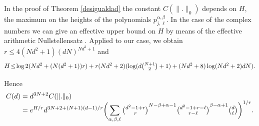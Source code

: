 \begin{obs}\label{effective} In the proof of Theorem \ref{desigualdad} the constant $C(\|.\|_0)$ depends on $H$, the maximum on the heights of the polynomials $p_{j,\ell}^{\alpha,\beta}$. In the case of the complex numbers we can give an effective upper bound on $H$ by means of the effective arithmetic Nullstellensatz \cite[Th.\,1]{klpasom}. Applied to our case, we obtain $r\leq 4(Nd^2+1)(dN)^{Nd^2+1}$ and
\begin{equation*}
H\!\leq\!\log{2}(Nd^2+(N(d^2+1))r)+r(Nd^2+2)(\log(d\tbinom{N+1}{2}+1)+(Nd^2+8)\log(Nd^2+2)dN).
\end{equation*}
\end{obs}
Hence
\begin{equation*}
\begin{split}
C(d)& =d^{3N+2}C(\|.\|_0) \\[-5pt]
& =e^{H/r}d^{3N+2+(N+1)(d-1)/r}\biggl( \sum_{\alpha,\beta,\ell}{{\tbinom{d^2-1+r}{r}}^{{N-\beta+\alpha-1}}{\tbinom{d^2-1+r-\ell}{r-\ell}}^{{\beta-\alpha+1}}\tbinom{d}{\ell}}\biggr)^{1/r}.
\end{split}
\end{equation*}

